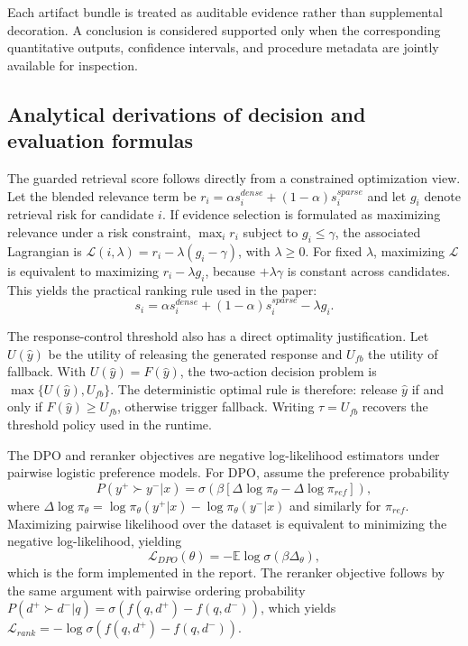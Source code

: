 ﻿\documentclass[a4paper,12pt]{article}
\begin{document}
Each artifact bundle is treated as auditable evidence rather than supplemental decoration. A conclusion is considered supported only when the corresponding quantitative outputs, confidence intervals, and procedure metadata are jointly available for inspection.

\subsection{Analytical derivations of decision and evaluation formulas}
The guarded retrieval score follows directly from a constrained optimization view. Let the blended relevance term be \(r_i=\alpha s_i^{dense}+(1-\alpha)s_i^{sparse}\) and let \(g_i\) denote retrieval risk for candidate \(i\). If evidence selection is formulated as maximizing relevance under a risk constraint, \(\max_i r_i\) subject to \(g_i\le\gamma\), the associated Lagrangian is \(\mathcal{L}(i,\lambda)=r_i-\lambda(g_i-\gamma)\), with \(\lambda\ge0\). For fixed \(\lambda\), maximizing \(\mathcal{L}\) is equivalent to maximizing \(r_i-\lambda g_i\), because \(+\lambda\gamma\) is constant across candidates. This yields the practical ranking rule used in the paper:
\begin{equation}
s_i=\alpha s_i^{dense}+(1-\alpha)s_i^{sparse}-\lambda g_i.
\end{equation}

The response-control threshold also has a direct optimality justification. Let \(U(\hat{y})\) be the utility of releasing the generated response and \(U_{fb}\) the utility of fallback. With \(U(\hat{y})=F(\hat{y})\), the two-action decision problem is \(\max\{U(\hat{y}),U_{fb}\}\). The deterministic optimal rule is therefore: release \(\hat{y}\) if and only if \(F(\hat{y})\ge U_{fb}\), otherwise trigger fallback. Writing \(\tau=U_{fb}\) recovers the threshold policy used in the runtime.

The DPO and reranker objectives are negative log-likelihood estimators under pairwise logistic preference models. For DPO, assume the preference probability
\begin{equation}
P(y^+\succ y^-|x)=\sigma\!\left(\beta\left[\Delta\log\pi_\theta-\Delta\log\pi_{ref}\right]\right),
\end{equation}
where \(\Delta\log\pi_\theta=\log\pi_\theta(y^+|x)-\log\pi_\theta(y^-|x)\) and similarly for \(\pi_{ref}\). Maximizing pairwise likelihood over the dataset is equivalent to minimizing the negative log-likelihood, yielding
\begin{equation}
\mathcal{L}_{DPO}(\theta)=-\mathbb{E}\log \sigma\!\left(\beta\Delta_\theta\right),
\end{equation}
which is the form implemented in the report. The reranker objective follows by the same argument with pairwise ordering probability \(P(d^+\succ d^-|q)=\sigma(f(q,d^+)-f(q,d^-))\), which yields \(\mathcal{L}_{rank}=-\log \sigma(f(q,d^+)-f(q,d^-))\).
\end{document}
